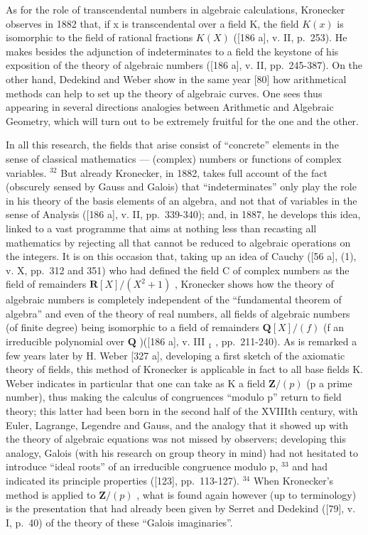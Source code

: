 As for the role of transcendental numbers in algebraic calculations, Kronecker observes in 1882 that, if x is transcendental over a field K, the field \(K(x)\) is isomorphic to the field of rational fractions \(K(X)\) ({[}186 a{]}, v. II, p.~253). He makes besides the adjunction of indeterminates to a field the keystone of his exposition of the theory of algebraic numbers ({[}186 a{]}, v. II, pp.~245-387). On the other hand, Dedekind and Weber show in the same year {[}80{]} how arithmetical methods can help to set up the theory of algebraic curves. One sees thus appearing in several directions analogies between Arithmetic and Algebraic Geometry, which will turn out to be extremely fruitful for the one and the other.

In all this research, the fields that arise consist of ``concrete'' elements in the sense of classical mathematics --- (complex) numbers or functions of complex variables. \(^{32}\) But already Kronecker, in 1882, takes full account of the fact (obscurely sensed by Gauss and Galois) that ``indeterminates'' only play the role in his theory of the basis elements of an algebra, and not that of variables in the sense of Analysis ({[}186 a{]}, v. II, pp.~339-340); and, in 1887, he develops this idea, linked to a vast programme that aims at nothing less than recasting all mathematics by rejecting all that cannot be reduced to algebraic operations on the integers. It is on this occasion that, taking up an idea of Cauchy ({[}56 a{]}, (1), v. X, pp.~312 and 351) who had defined the field C of complex numbers as the field of remainders \(\mathbf{R}[X]/(X^{2}+1)\) , Kronecker shows how the theory of algebraic numbers is completely independent of the ``fundamental theorem of algebra'' and even of the theory of real numbers, all fields of algebraic numbers (of finite degree) being isomorphic to a field of remainders \(\mathbf{Q}[X]/(f)\) (f an irreducible polynomial over \(\mathbf{Q}\) )({[}186 a{]}, v. III \(_{1}\) , pp.~211-240). As is remarked a few years later by H. Weber {[}327 a{]}, developing a first sketch of the axiomatic theory of fields, this method of Kronecker is applicable in fact to all base fields K. Weber indicates in particular that one can take as K a field \(\mathbf{Z}/(p)\) (p a prime number), thus making the calculus of congruences ``modulo p'' return to field theory; this latter had been born in the second half of the XVIIIth century, with Euler, Lagrange, Legendre and Gauss, and the analogy that it showed up with the theory of algebraic equations was not missed by observers; developing this analogy, Galois (with his research on group theory in mind) had not hesitated to introduce ``ideal roots'' of an irreducible congruence modulo p, \(^{33}\) and had indicated its principle properties ({[}123{]}, pp.~113-127). \(^{34}\) When Kronecker's method is applied to \(\mathbf{Z}/(p)\) , what is found again however (up to terminology) is the presentation that had already been given by Serret and Dedekind ({[}79{]}, v. I, p.~40) of the theory of these ``Galois imaginaries''.

